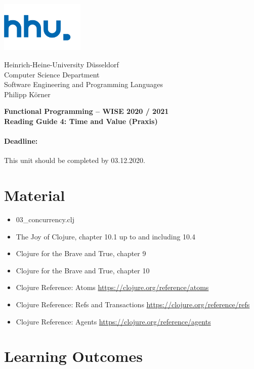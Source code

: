 \documentclass[11pt,a4paper]{article}
\begin{document}
\begin{minipage}[b]{\textwidth}
	\parbox[t]{5cm}{%
		\includegraphics[width=4cm]{unilogo}
		\hfill
	}
	\parbox[b]{11cm}{%
		Heinrich-Heine-University D\"usseldorf\\
		Computer Science Department\\
		Software Engineering and Programming Languages\\
		Philipp K\"orner
	}
\end{minipage}
\begin{center}
	\bf
	Functional Programming -- WISE 2020 / 2021\\
	Reading Guide 4: Time and Value (Praxis)
\end{center}

\pagestyle{empty}

\paragraph{Deadline:} This unit should be completed by 03.12.2020.

\section{Material} 

\begin{itemize}
    \item 03\_concurrency.clj
    \item The Joy of Clojure, chapter 10.1 up to and including 10.4
    \item Clojure for the Brave and True, chapter 9
    \item Clojure for the Brave and True, chapter 10
    \item Clojure Reference: Atoms \url{https://clojure.org/reference/atoms}
    \item Clojure Reference: Refs and Transactions \url{https://clojure.org/reference/refs}
    \item Clojure Reference: Agents \url{https://clojure.org/reference/agents}
\end{itemize}


\section{Learning Outcomes}
\end{document}
